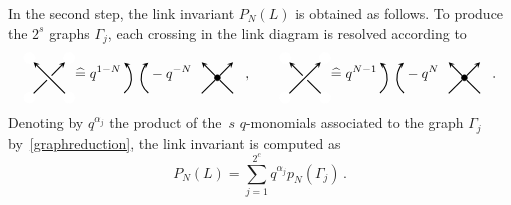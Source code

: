 \documentclass{compositio}
\theoremstyle{definition}
\numberwithin{equation}{section}
\begin{document}
In the second step, the link invariant $P_{N}(L)$ is obtained as follows. To produce the $2^s$ graphs $\Gamma_{j}$, each crossing in the link diagram is resolved according to
\begin{equation}
\label{graphreduction}
\begin{tikzpicture}[scale=0.5,baseline, inner sep=1mm, >=stealth]
\node (0) at (0,0) [circle,inner sep=1.5pt, draw=white,fill= white] {};
\node (bl) at (-1,-1) [circle,draw=white,fill= white] {};
\node (br) at (1,-1) [circle,draw=white,fill= white] {};
\node (tl) at (-1,1) [circle,draw=white,fill= white] {};
\node (tr) at (1,1) [circle,draw=white,fill= white] {};
\draw[-, thick] (bl) -- (0); 
\draw[->, thick] (br) -- (tl); 
\draw[->, thick] (0) -- (tr); 
\end{tikzpicture}
\widehat = \;
q^{1-N} \,
\begin{tikzpicture}[scale=0.5,baseline, inner sep=1mm, >=stealth]
\draw[ ->, thick, shift={(-2.5,0)} ]  (-50:1) arc (-50:50:1); 
\draw[ ->, thick ] (230:1) arc (230:130:1); 
\end{tikzpicture}
- q^{-N} 
\begin{tikzpicture}[scale=0.5,baseline, inner sep=1mm, >=stealth]
\node (bl) at (-1,-1) [circle] {};
\node (br) at (1,-1) [circle] {};
\node (tl) at (-1,1) [circle] {};
\node (tr) at (1,1) [circle] {};
\node (0) at (0,0) [circle,inner sep=1.5pt, thin,draw=black,fill= black] {};
\draw[-,  thick] (bl) -- (0); 
\draw[-,  thick] (br) -- (0); 
\draw[->,  thick] (0) -- (tl); 
\draw[->,  thick] (0) -- (tr); 
\end{tikzpicture}
\, , \qquad 
\begin{tikzpicture}[scale=0.5,baseline, inner sep=1mm, >=stealth]
\node (0) at (0,0) [circle,inner sep=1.5pt, draw=white,fill= white] {};
\node (bl) at (-1,-1) [circle,draw=white,fill= white] {};
\node (br) at (1,-1) [circle,draw=white,fill= white] {};
\node (tl) at (-1,1) [circle,draw=white,fill= white] {};
\node (tr) at (1,1) [circle,draw=white,fill= white] {};
\draw[->, thick] (bl) -- (tr); 
\draw[-, thick] (br) -- (0); 
\draw[->, thick] (0) -- (tl); 
\end{tikzpicture}
\widehat = \;
q^{N-1} \,
\begin{tikzpicture}[scale=0.5,baseline, inner sep=1mm, >=stealth]
\draw[ ->, thick, shift={(-2.5,0)} ]  (-50:1) arc (-50:50:1); 
\draw[ ->, thick ] (230:1) arc (230:130:1); 
\end{tikzpicture}
- q^{N} 
\begin{tikzpicture}[scale=0.5,baseline, inner sep=1mm, >=stealth]
\node (bl) at (-1,-1) [circle] {};
\node (br) at (1,-1) [circle] {};
\node (tl) at (-1,1) [circle] {};
\node (tr) at (1,1) [circle] {};
\node (0) at (0,0) [circle,inner sep=1.5pt, thin,draw=black,fill= black] {};
\draw[-,  thick] (bl) -- (0); 
\draw[-,  thick] (br) -- (0); 
\draw[->,  thick] (0) -- (tl); 
\draw[->,  thick] (0) -- (tr); 
\end{tikzpicture} \, .
\end{equation}
Denoting by $q^{\alpha_j}$ the product of the~$s$ $q$-monomials associated to the graph $\Gamma_{j}$ by~\eqref{graphreduction}, the link invariant is computed as
$$
P_{N}(L) = \sum_{j=1}^{2^c} q^{\alpha_j} p_{N}(\Gamma_{j}) \, .
$$
\end{document}
